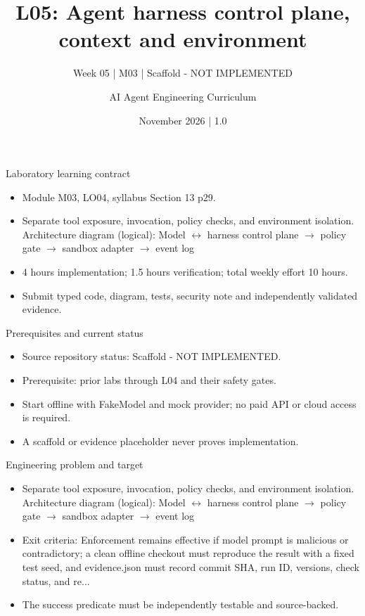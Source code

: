 \documentclass[aspectratio=169,10pt]{beamer}
\title[L05 - Agent Engineering]{L05: Agent harness control plane, context and environment}
\subtitle{Week 05 | M03 | Scaffold - NOT IMPLEMENTED}
\author{AI Agent Engineering Curriculum}
\date{November 2026 | 1.0}
\begin{document}
\begin{frame}\titlepage\end{frame}

\begin{frame}{Laboratory learning contract}
\small
\begin{itemize}
\item Module M03, LO04, syllabus Section 13 p29.
\item Separate tool exposure, invocation, policy checks, and environment isolation. Architecture diagram (logical): Model $\leftrightarrow$ harness control plane $\rightarrow$ policy gate $\rightarrow$ sandbox adapter $\rightarrow$ event log
\item 4 hours implementation; 1.5 hours verification; total weekly effort 10 hours.
\item Submit typed code, diagram, tests, security note and independently validated evidence.
\end{itemize}

\end{frame}

\begin{frame}{Prerequisites and current status}
\small
\begin{itemize}
\item Source repository status: Scaffold - NOT IMPLEMENTED.
\item Prerequisite: prior labs through L04 and their safety gates.
\item Start offline with FakeModel and mock provider; no paid API or cloud access is required.
\item A scaffold or evidence placeholder never proves implementation.
\end{itemize}

\end{frame}

\begin{frame}{Engineering problem and target}
\small
\begin{itemize}
\item Separate tool exposure, invocation, policy checks, and environment isolation. Architecture diagram (logical): Model $\leftrightarrow$ harness control plane $\rightarrow$ policy gate $\rightarrow$ sandbox adapter $\rightarrow$ event log
\item Exit criteria: Enforcement remains effective if model prompt is malicious or contradictory; a clean offline checkout must reproduce the result with a fixed test seed, and evidence.json must record commit SHA, run ID, versions, check status, and re...
\item The success predicate must be independently testable and source-backed.
\end{itemize}

\end{frame}
\end{document}
